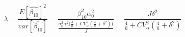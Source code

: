 \begin{equation}
\label{eq:lambda}
\lambda = \frac{E[\hat{\beta_{10}}]^2}{var[\hat{\beta_{10}}]} = \frac{\beta_{10}^2\alpha_0^2}{\frac{\sigma_0^2\alpha_0^2\Big(\frac{4}{n} + CV_{\alpha}^2(\frac{4}{n} + \delta^2)\Big)}{J}} = \frac{J\delta^2}{\frac{4}{n}+CV_{\alpha}^2(\frac{4}{n} + \delta^2)}
\end{equation}